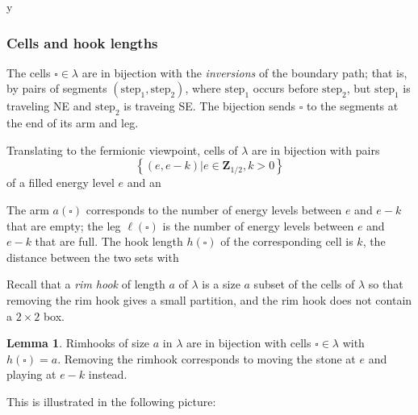 y\documentclass{amsart}[12pt]
\theoremstyle{definition}
\newtheorem{lemma}[dummy]{Lemma}
\newcommand{\Z}{\mathbf{Z}}
\begin{document}
\subsubsection{Cells and hook lengths}

The cells $\square\in\lambda$ are in bijection with the
\emph{inversions} of the boundary path; that is, by pairs of segments
$(\text{step}_1, \text{step}_2)$, where $\text{step}_1$ occurs before $\text{step}_2$,
but $\text{step}_1$ is traveling NE and $\text{step}_2$ is traveing SE.  The bijection
sends $\square$ to the segments at the end of its arm and leg.

Translating to the fermionic viewpoint, cells of $\lambda$ are in
bijection with pairs 
$$\left\{(e, e-k)\big | e\in\Z_{1/2}, k>0\right\}$$ of a filled energy level $e$ and an


The arm $a(\square)$ corresponds to the number of energy levels between $e$ and $e-k$ that are empty; the leg $\ell(\square)$ is the number of energy levels between $e$ and $e-k$ that are full.  The hook length $h(\square)$ of the corresponding cell is $k$, the distance between the two sets with 

Recall that a \emph{rim hook} of length $a$ of $\lambda$ is a size $a$ subset of the cells of $\lambda$ so that removing the rim hook gives a small partition, and the rim hook does not contain a $2\times 2$ box.  

\begin{lemma} \label{lem:rimhooks}
Rimhooks of size $a$ in $\lambda$ are in bijection with cells $\square\in\lambda$ with $h(\square)=a$.  Removing the rimhook corresponds to moving the stone at $e$ and playing at $e-k$ instead.
\end{lemma}

This is illustrated in the following picture:
\end{document}
